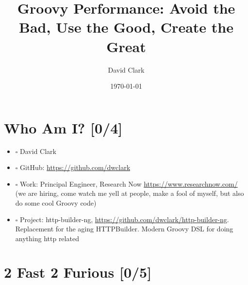 \documentclass[11pt]{article}
\author{David Clark}
\date{\today}
\title{Groovy Performance: Avoid the Bad, Use the Good, Create the Great}
\begin{document}
\maketitle
\tableofcontents

\section{Who Am I? [0/4]}
\label{sec:orgheadline1}

\begin{itemize}
\item $\square$ David Clark

\item $\square$ GitHub: \url{https://github.com/dwclark}

\item $\square$ Work: Principal Engineer, Research Now \url{https://www.researchnow.com/} (we are hiring, come watch me yell at people, make a fool of myself, but also do some cool Groovy code)

\item $\square$ Project: http-builder-ng, \url{https://github.com/dwclark/http-builder-ng}. Replacement for the aging HTTPBuilder. Modern Groovy DSL for doing anything http related
\end{itemize}

\section{2 Fast 2 Furious [0/5]}
\label{sec:orgheadline2}
\end{document}
